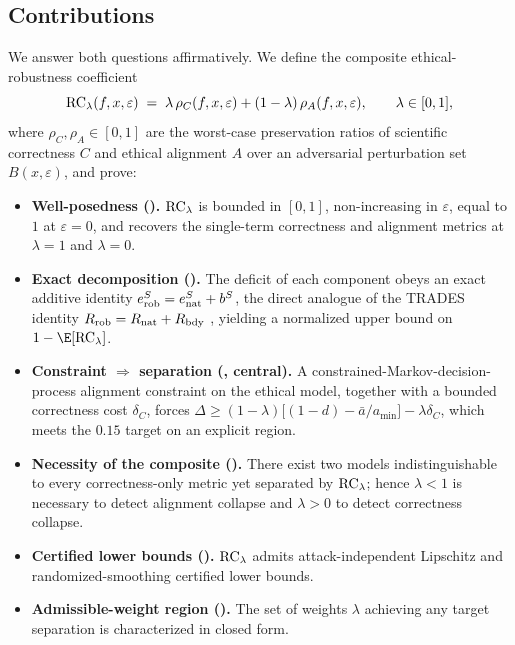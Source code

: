 \subsection{Contributions}
We answer both questions affirmatively. We define the composite ethical-robustness
coefficient
\[
  \mathrm{RC}_\lambda(f,x,\varepsilon) \;=\; \lambda\,\rho_C(f,x,\varepsilon)
    + (1-\lambda)\,\rho_A(f,x,\varepsilon), \qquad \lambda\in[0,1],
\]
where $\rho_C,\rho_A\in[0,1]$ are the worst-case preservation ratios of scientific
correctness $C$ and ethical alignment $A$ over an adversarial perturbation set
$B(x,\varepsilon)$, and prove:

\begin{itemize}[leftmargin=*,itemsep=2pt,topsep=2pt]
  \item \textbf{Well-posedness ().} $\mathrm{RC}_\lambda$ is bounded in
  $[0,1]$, non-increasing in $\varepsilon$, equal to $1$ at $\varepsilon=0$, and
  recovers the single-term correctness and alignment metrics at $\lambda=1$ and
  $\lambda=0$.
  \item \textbf{Exact decomposition ().} The deficit of each
  component obeys an exact additive identity $e_{\mathrm{rob}}^S=e_{\mathrm{nat}}^S+b^S$, the direct
  analogue of the TRADES identity $R_{\mathrm{rob}}=R_{\mathrm{nat}}+R_\mathrm{bdy}$ \cite{Zhang2019},
  yielding a normalized upper bound on $1-\E[\RC_\lambda]$.
  \item \textbf{Constraint $\Rightarrow$ separation (, central).} A
  constrained-Markov-decision-process alignment constraint on the ethical model,
  together with a bounded correctness cost $\delta_C$, forces
  $\Delta \ge (1-\lambda)\big[(1-d)-\bar a/a_{\min}\big]-\lambda\delta_C$, which
  meets the $0.15$ target on an explicit region.
  \item \textbf{Necessity of the composite ().} There exist two
  models indistinguishable to every correctness-only metric yet separated by
  $\mathrm{RC}_\lambda$; hence $\lambda<1$ is necessary to detect alignment collapse and
  $\lambda>0$ to detect correctness collapse.
  \item \textbf{Certified lower bounds ().} $\mathrm{RC}_\lambda$
  admits attack-independent Lipschitz and randomized-smoothing certified lower
  bounds.
  \item \textbf{Admissible-weight region ().} The set of weights
  $\lambda$ achieving any target separation is characterized in closed form.
\end{itemize}

